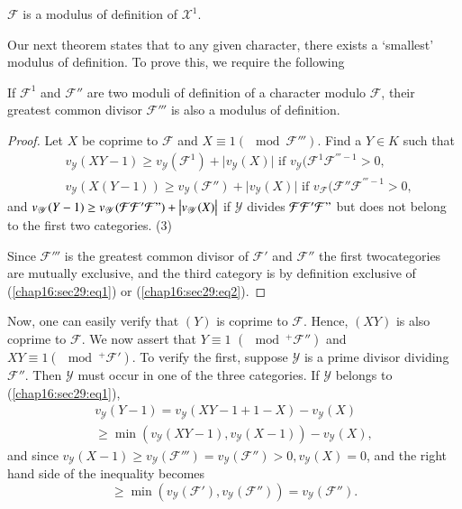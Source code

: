 \begin{coro*}%
  $\mathcal{F}$ is a modulus of definition of $\mathcal{X}^1$.
\end{coro*}

Our next theorem states that to any given character, there exists a
`smallest' modulus of definition. To prove this, we require the
following 

\begin{lemma*}%
  If $\mathcal{F}^1$ and $\mathcal{F}''$ are two moduli of definition
  of a character modulo $\mathcal{F}$, their greatest common divisor
  $\mathcal{F}'''$ is also a modulus of definition. 
\end{lemma*}

\begin{proof}
  Let $X$ be coprime to $\mathcal{F}$ and $X \equiv 1 (\mod
  \mathcal{F}''')$. Find a $Y \in K$ such that  
  \begin{align*}
    & v_\mathscr{Y} (XY - 1) \ge v_\mathscr{Y} (\mathcal{F}^1) + \big |
    v_\mathscr{Y} (X) \big | \text{ if } v_\mathscr{Y} (\mathcal{F}^1
    \mathcal{F}^{''' - 1} > 0,\tag{1}\label{chap16:sec29:eq1} \\ 
    & v_\mathscr{Y} (X (Y - 1)) \ge v_\mathscr{Y} (\mathcal{F}'') +
    \big | v_\mathscr{Y} (X) \big | \text{ if } v_\mathscr{F}
    (\mathcal{F}'' \mathcal{F}^{''' -1} > 0,\tag{2}\label{chap16:sec29:eq2} 
  \end{align*}
and $v_\mathscr{Y} (Y - 1) \ge v_\mathscr{Y}
    (\mathcal{F} \mathcal{F}' \mathcal{F}") + \big | v_\mathscr{Y} (X)
    \big |$ if  $\mathscr{Y}$  divides  $\mathcal{F}
    \mathcal{F}' \mathcal{F}"$  but does not belong to the first two
    categories. \hfill (3)

    Since $\mathcal{F}'''$ is the greatest common divisor of
    $\mathcal{F}'$ and $\mathcal{F}''$ the first  two\pageoriginale categories are
    mutually exclusive, and the third category is by definition exclusive
    of (\ref{chap16:sec29:eq1}) or (\ref{chap16:sec29:eq2}). 
\end{proof}

Now, one can easily verify that $(Y)$ is coprime to
$\mathcal{F}$. Hence, $(XY)$ is also coprime to $\mathcal{F}$. We now
assert that $Y \equiv 1$ $(\mod ^+ \mathcal{F}'')$ and $XY \equiv 1
(\mod^+ \mathcal{F}' )$. To verify the first, suppose $\mathscr{Y}$ is
a prime divisor dividing $\mathcal{F}''$. Then $\mathscr{Y}$ must occur
in one of the three categories. If $\mathscr{Y} $ belongs to
(\ref{chap16:sec29:eq1}), 
\begin{multline*}
  v_\mathscr{Y} (Y - 1) =  v_\mathscr{Y} (XY - 1 + 1 - X) - v_\mathscr{Y} (X)\\
  \ge \min (v_\mathscr{Y} (XY - 1), v_\mathscr{Y} (X - 1)) - v_\mathscr{Y}(X),
\end{multline*}
and since $v_\mathscr{Y} (X- 1) \ge v_\mathscr{Y} (\mathcal{F}''') =
v_\mathscr{Y} (\mathcal{F}'') > 0, v_\mathscr{Y} (X) = 0$, and the
right hand side of the inequality becomes 
$$
\ge \min (v_\mathscr{Y} (\mathcal{F}'), v_\mathscr{Y} (\mathcal{F}''))
= v_\mathscr{Y} (\mathcal{F}''). 
$$

